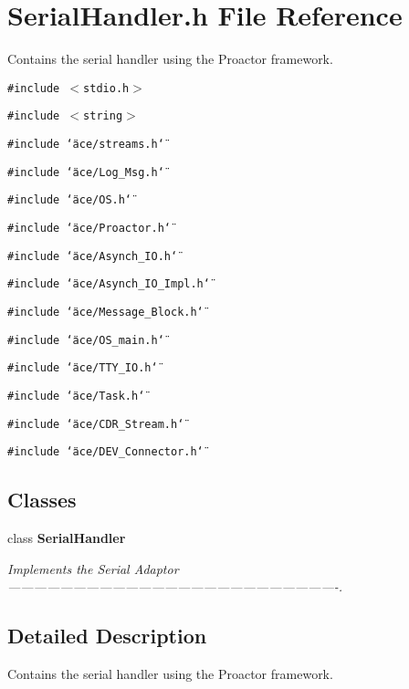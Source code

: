 \section{Serial\-Handler.h File Reference}
\label{SerialHandler_8h}
Contains the serial handler using the Proactor framework.  


{\tt \#include $<$stdio.h$>$}\par
{\tt \#include $<$string$>$}\par
{\tt \#include \char`\"{}ace/streams.h\char`\"{}}\par
{\tt \#include \char`\"{}ace/Log\_\-Msg.h\char`\"{}}\par
{\tt \#include \char`\"{}ace/OS.h\char`\"{}}\par
{\tt \#include \char`\"{}ace/Proactor.h\char`\"{}}\par
{\tt \#include \char`\"{}ace/Asynch\_\-IO.h\char`\"{}}\par
{\tt \#include \char`\"{}ace/Asynch\_\-IO\_\-Impl.h\char`\"{}}\par
{\tt \#include \char`\"{}ace/Message\_\-Block.h\char`\"{}}\par
{\tt \#include \char`\"{}ace/OS\_\-main.h\char`\"{}}\par
{\tt \#include \char`\"{}ace/TTY\_\-IO.h\char`\"{}}\par
{\tt \#include \char`\"{}ace/Task.h\char`\"{}}\par
{\tt \#include \char`\"{}ace/CDR\_\-Stream.h\char`\"{}}\par
{\tt \#include \char`\"{}ace/DEV\_\-Connector.h\char`\"{}}\par
\subsection*{Classes}
\begin{CompactItemize}
\item 
class {\bf Serial\-Handler}
\begin{CompactList}\small\item\em Implements the Serial Adaptor ----------------------------------------------------------------------------. \item\end{CompactList}\end{CompactItemize}


\subsection{Detailed Description}
Contains the serial handler using the Proactor framework. 

